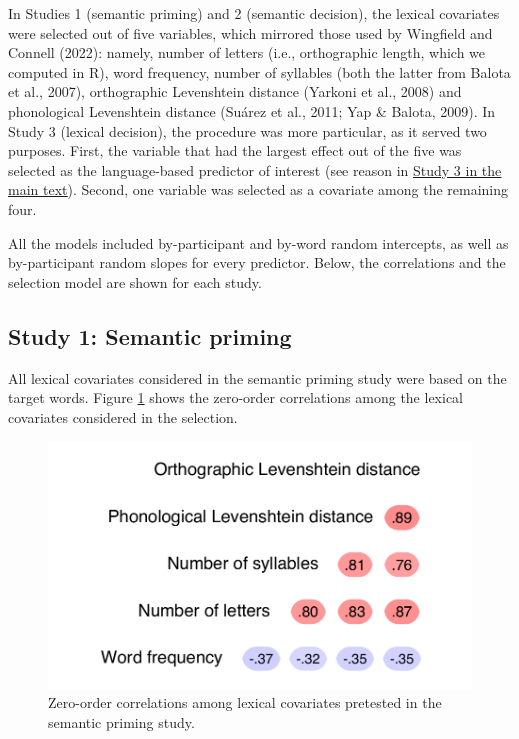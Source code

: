 \documentclass[
  12pt,
  man,floatsintext]{apa7}
\begin{document}
In Studies 1 (semantic priming) and 2 (semantic decision), the lexical covariates were selected out of five variables, which mirrored those used by Wingfield and Connell (2022): namely, number of letters (i.e., orthographic length, which we computed in R), word frequency, number of syllables (both the latter from Balota et al., 2007), orthographic Levenshtein distance (Yarkoni et al., 2008) and phonological Levenshtein distance (Suárez et al., 2011; Yap \& Balota, 2009). In Study 3 (lexical decision), the procedure was more particular, as it served two purposes. First, the variable that had the largest effect out of the five was selected as the language-based predictor of interest (see reason in \protect\hyperlink{lexicaldecision}{\underline{Study 3 in the main text}}). Second, one variable was selected as a covariate among the remaining four.

All the models included by-participant and by-word random intercepts, as well as by-participant random slopes for every predictor. Below, the correlations and the selection model are shown for each study.

\hypertarget{study-1-semantic-priming}{%
\subsection{Study 1: Semantic priming}\label{study-1-semantic-priming}}

All lexical covariates considered in the semantic priming study were based on the target words. Figure \ref{fig:semanticpriming-lexical-covariates-correlations} shows the zero-order correlations among the lexical covariates considered in the selection.

\begin{figure}

{\centering \includegraphics[width=0.5\linewidth]{thesis-core_files/figure-latex/semanticpriming-lexical-covariates-correlations-1} 

}

\caption{Zero-order correlations among lexical covariates pretested in the semantic priming study.}\label{fig:semanticpriming-lexical-covariates-correlations}
\end{figure}
\end{document}
